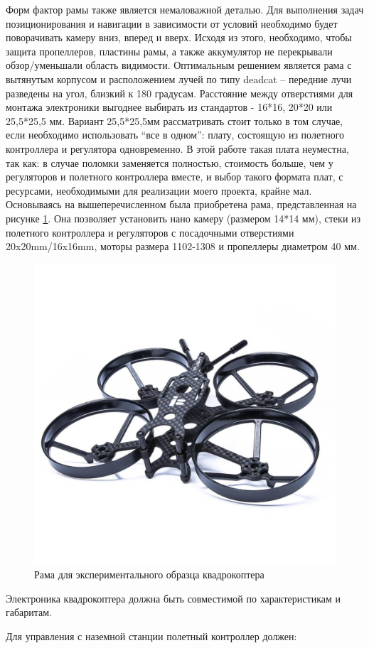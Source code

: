Форм фактор рамы также является немаловажной деталью. Для выполнения задач позиционирования и навигации в зависимости от условий необходимо будет поворачивать камеру вниз, вперед и вверх. Исходя из этого, необходимо, чтобы защита пропеллеров, пластины рамы, а также аккумулятор не перекрывали обзор/уменьшали область видимости. Оптимальным решением является рама с вытянутым корпусом и расположением лучей по типу deadcat – передние лучи разведены на угол, близкий к 180 градусам. Расстояние между отверстиями для монтажа электроники выгоднее выбирать из стандартов - 16*16, 20*20 или 25,5*25,5 мм. Вариант 25,5*25,5мм рассматривать стоит только в том случае, если необходимо использовать “все в одном”: плату, состоящую из полетного контроллера и регулятора одновременно. В этой работе такая плата неуместна, так как: в случае поломки заменяется полностью, стоимость больше, чем у регуляторов и полетного контроллера вместе, и выбор такого формата плат, с ресурсами, необходимыми для реализации моего проекта, крайне мал. Основываясь на вышеперечисленном была приобретена рама, представленная на рисунке \ref{fig:frame}. Она позволяет установить нано камеру (размером 14*14 мм), стеки из полетного контроллера и регуляторов с посадочными отверстиями 20x20mm/16x16mm, моторы размера 1102-1308 и пропеллеры диаметром 40 мм.



\begin{figure}[H]
	\centering
	\includegraphics[width=0.5\linewidth]{pics/frame}
	\caption{Рама для экспериментального образца квадрокоптера
	}
	\label{fig:frame} %
\end{figure}

Электроника квадрокоптера должна быть совместимой по характеристикам и габаритам. 

Для управления с наземной станции полетный контроллер должен:

